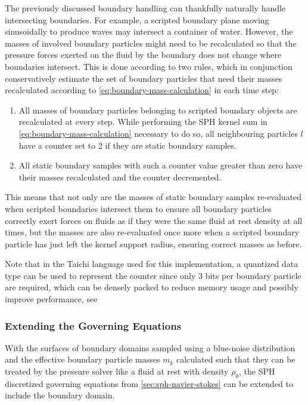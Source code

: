 \documentclass[oneside, a4paper]{book}
\begin{document}
    The previously discussed boundary handling can thankfully naturally handle intersecting boundaries. For example, a scripted boundary plane moving sinusoidally to produce waves may intersect a container of water. However, the masses of involved boundary particles might need to be recalculated so that the pressure forces exerted on the fluid by the boundary does not change where boundaries intersect. This is done according to two rules, which in conjunction conservatively estimate the set of boundary particles that need their masses recalculated according to \autoref{eq:boundary-mass-calculation} in each time step:
    \begin{enumerate}
      \item All masses of boundary particles belonging to scripted boundary objects are recalculated at every step. While performing the SPH kernel sum in \autoref{eq:boundary-mass-calculation} necessary to do so, all neighbouring particles $l$ have a counter set to 2 if they are static boundary samples.
      \item All static boundary samples with such a counter value greater than zero have their masses recalculated and the counter decremented.
    \end{enumerate}
    This means that not only are the masses of static boundary samples re-evaluated when scripted boundaries intersect them to ensure all boundary particles correctly exert forces on fluids as if they were the same fluid at rest density at all times, but the masses are also re-evaluated once more when a scripted boundary particle has just left the kernel support radius, ensuring correct masses as before. 
    
    Note that in the Taichi language used for this implementation, a quantized data type can be used to represent the counter since only 3 bits per boundary particle are required, which can be densely packed to reduce memory usage and possibly improve performance, see \autocite[Hu et al.]{quantized-taichi}

    \subsubsection{Extending the Governing Equations}\label{subsub:bdy-extend-governing}
    With the surfaces of boundary domains sampled using a blue-noise distribution and the effective boundary particle masses $m_k$ calculated such that they can be treated by the pressure solver like a fluid at rest with density $\rho_0$, the SPH discretized governing equations from \autoref{sec:sph-navier-stokes} can be extended to include the boundary domain.
\end{document}
